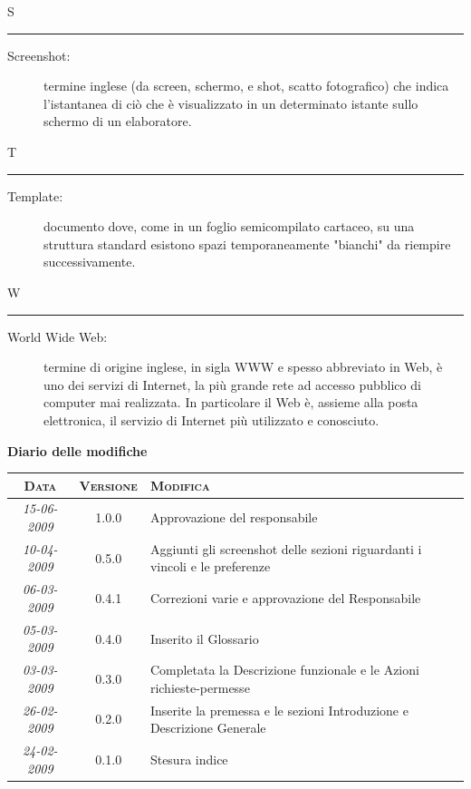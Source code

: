\documentclass[11pt,a4paper]{article}
\newcommand{\modifiche} 
{
\newpage
\begin{center}
\textbf{Diario delle modifiche} \\
\bigskip
\begin{tabular}{|c|c|p{0.62\textwidth}|}
\hline
\textsc{Data} & \textsc{Versione} & \textsc{Modifica} \\
\hline
\hline
\textit{15-06-2009} & 1.0.0 & Approvazione del responsabile\\
\hline
\textit{10-04-2009} & 0.5.0 & Aggiunti gli screenshot delle sezioni riguardanti i vincoli e le preferenze\\
\hline
\textit{06-03-2009} & 0.4.1 & Correzioni varie e approvazione del Responsabile\\
\hline
\textit{05-03-2009} & 0.4.0 & Inserito il Glossario\\
\hline
\textit{03-03-2009} & 0.3.0 & Completata la Descrizione funzionale e le Azioni richieste-permesse\\
\hline
\textit{26-02-2009} & 0.2.0 & Inserite la premessa e le sezioni Introduzione e Descrizione Generale\\
\hline
\textit{24-02-2009} & 0.1.0 & Stesura indice\\
\hline
\end{tabular}
\end{center}
}
\begin{document}
\bigskip
\Huge S \bigskip
\hrule
\smallskip
\normalsize
\begin{description}
	\item[Screenshot:] termine inglese (da screen, schermo, e shot, scatto fotografico) che indica l'istantanea di ciò che è visualizzato in un determinato istante sullo schermo di un elaboratore.
\end{description}
\bigskip
\Huge T \bigskip
\hrule
\smallskip
\normalsize
\begin{description}
	\item[Template:] documento dove, come in un foglio semicompilato cartaceo, su una struttura standard esistono spazi temporaneamente "bianchi" da riempire successivamente.
\end{description}
\bigskip
\Huge W \bigskip
\hrule
\smallskip
\normalsize
\begin{description}
	\item[World Wide Web:] termine di origine inglese, in sigla WWW e spesso abbreviato in Web, è uno dei servizi di Internet, la più grande rete ad accesso pubblico di computer mai realizzata. In particolare il Web è, assieme alla posta elettronica, il servizio di Internet più utilizzato e conosciuto.
\end{description}
\modifiche
\end{document}
